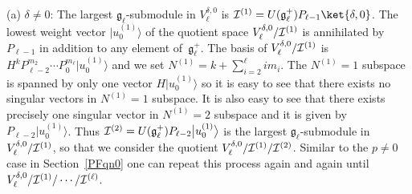 \documentclass[pdftex]{sigma}
\numberwithin{equation}{section}
\begin{document}
(a) $ \delta \neq 0$: The largest ${\mathfrak g}_{\ell}$-submodule in $ V^{\delta,0}_{\ell} $ is $ {\cal
I}^{(1)} = U({\mathfrak g}_{\ell}^+) P_{\ell-1} \ket{\delta,0}$.
The lowest weight vector $ \big|u_0^{(1)}\big\rangle  $ of the quotient space $ V^{\delta,0}_{\ell}/{\cal I}^{(1)} $ is annihilated
by $ P_{\ell-1} $ in addition to any element of~$ {\mathfrak g}_{\ell}^+$.
The basis of $ V^{\delta,0}_{\ell}/{\cal I}^{(1)} $ is $ H^k P_{\ell-2}^{m_2} \cdots P_0^{m_{\ell}} \big|u_0^{(1)}\big\rangle  $ and
we set $  N^{(1)} = k + \sum\limits_{i=2}^{\ell} i   m_i$.
The $ N^{(1)} = 1 $ subspace is spanned by only one vector $ H \big|u_0^{(1)}\big\rangle  $ so it is easy to see that there exists
no singular vectors in $ N^{(1)} = 1 $ subspace.
It is also easy to see that there exists precisely one singular vector in $ N^{(1)} = 2 $ subspace and it is given by $
P_{\ell-2} \big|u_0^{(1)}\big\rangle $.
Thus $ {\cal I}^{(2)} = U({\mathfrak g}_{\ell}^+) P_{\ell-2} \big|u_0^{(1)}\big\rangle  $ is the largest ${\mathfrak
g}_{\ell}$-submodule in $ V^{\delta,0}_{\ell}/{\cal I}^{(1)} $, so that we consider the quotient $
V^{\delta,0}_{\ell}/{\cal I}^{(1)}/{\cal I}^{(2)}$.
Similar to the $ p \neq 0 $ case in Section~\ref{PFqn0} one can repeat this process again and again until $
V^{\delta,0}_{\ell}/{\cal I}^{(1)}/\cdots/{\cal I}^{(\ell)}$.
\end{document}
